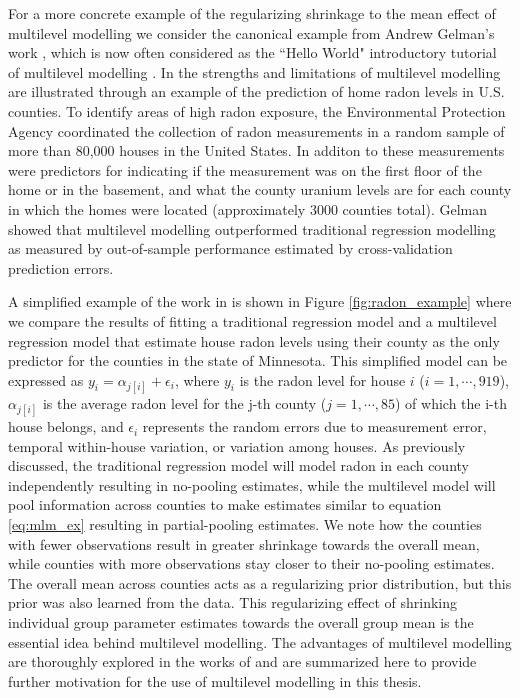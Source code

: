 For a more concrete example of the regularizing shrinkage to the mean effect of multilevel modelling we consider the canonical example from Andrew Gelman's work \cite{Gelman2006} \cite{Gelman2006b}, which is now often considered as the ``Hello World" introductory tutorial of multilevel modelling \cite{pymc32018}. In \cite{Gelman2006b} the strengths and limitations of multilevel modelling are illustrated through an example of the prediction of home radon levels in U.S. counties. To identify areas of high radon exposure, the Environmental Protection Agency coordinated the collection of radon measurements in a random sample of more than 80,000 houses in the United States. In additon to these measurements were predictors for indicating if the measurement was on the first floor of the home or in the basement, and what the county uranium levels are for each county in which the homes were located (approximately 3000 counties total). Gelman showed that multilevel modelling outperformed traditional regression modelling as measured by out-of-sample performance estimated by cross-validation prediction errors.

A simplified example of the work in \cite{Gelman2006b} is shown in Figure \ref{fig:radon_example} where we compare the results of fitting a traditional regression model and a multilevel regression model that estimate house radon levels using their county as the only predictor for the counties in the state of Minnesota. This simplified model can be expressed as $y_i = \alpha_{j[i]} + \epsilon_i$, where $y_i$ is the radon level for house $i$ ($i=1, \cdots ,919$), $\alpha_{j[i]}$ is the average radon level for the j-th county ($j=1, \cdots ,85$) of which the i-th house belongs, and $\epsilon_i$ represents the random errors due to measurement error, temporal within-house variation, or variation among houses. As previously discussed, the traditional regression model will model radon in each county independently resulting in no-pooling estimates, while the multilevel model will pool information across counties to make estimates similar to equation \ref{eq:mlm_ex} resulting in partial-pooling estimates. We note how the counties with fewer observations result in greater shrinkage towards the overall mean, while counties with more observations stay closer to their no-pooling estimates. The overall mean across counties acts as a regularizing prior distribution, but this prior was also learned from the data. This regularizing effect of shrinking individual group parameter estimates towards the overall group mean is the essential idea behind multilevel modelling. The advantages of multilevel modelling are thoroughly explored in the works of \cite{Gelman2014} \cite{Gelman2006} \cite{McElreath2020} and are summarized here to provide further motivation for the use of multilevel modelling in this thesis.


